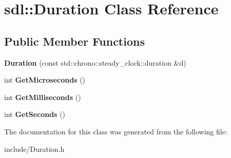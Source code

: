 \hypertarget{classsdl_1_1Duration}{\section{sdl\-:\-:Duration Class Reference}
\label{classsdl_1_1Duration}
}
\subsection*{Public Member Functions}
\begin{DoxyCompactItemize}
\item 
\hypertarget{classsdl_1_1Duration_a969e01af2551271d92f8e91c9306be50}{{\bfseries Duration} (const std\-::chrono\-::steady\-\_\-clock\-::duration \&d)}\label{classsdl_1_1Duration_a969e01af2551271d92f8e91c9306be50}

\item 
\hypertarget{classsdl_1_1Duration_aa4b50bbf3792db9a6140e337134e7ffe}{int {\bfseries Get\-Microseconds} ()}\label{classsdl_1_1Duration_aa4b50bbf3792db9a6140e337134e7ffe}

\item 
\hypertarget{classsdl_1_1Duration_a2a9183964d1c3657b80b3325c8f5e33d}{int {\bfseries Get\-Milliseconds} ()}\label{classsdl_1_1Duration_a2a9183964d1c3657b80b3325c8f5e33d}

\item 
\hypertarget{classsdl_1_1Duration_a003277f2dfaa4075f1e46fa3b8430ace}{int {\bfseries Get\-Seconds} ()}\label{classsdl_1_1Duration_a003277f2dfaa4075f1e46fa3b8430ace}

\end{DoxyCompactItemize}


The documentation for this class was generated from the following file\-:\begin{DoxyCompactItemize}
\item 
include/Duration.\-h\end{DoxyCompactItemize}
